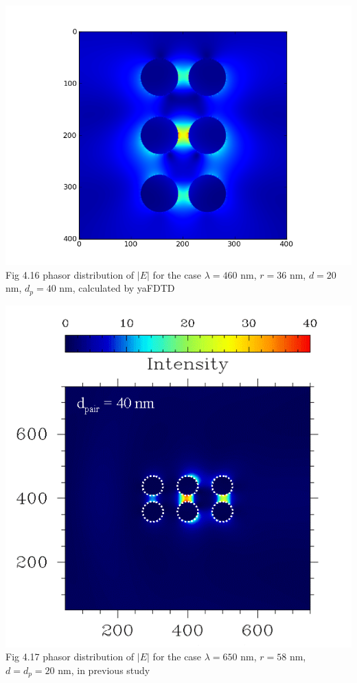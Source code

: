 \documentclass[openany]{book}
\begin{document}
\begin{center}
\includegraphics[scale=0.8]{images/etotal-d40.png}\\
Fig 4.16
phasor distribution of $|E|$ for the case $\lambda = 460$ nm, $r = 36$ nm, $d = 20$ nm, $d_p = 40$ nm, calculated by yaFDTD
\end{center}

\begin{center}
\includegraphics[scale=0.5]{images/d40.png}\\
Fig 4.17
phasor distribution of $|E|$ for the case $\lambda = 650$ nm, $r = 58$ nm, $d = d_p = 20$ nm, in previous study
\end{center}
\end{document}
